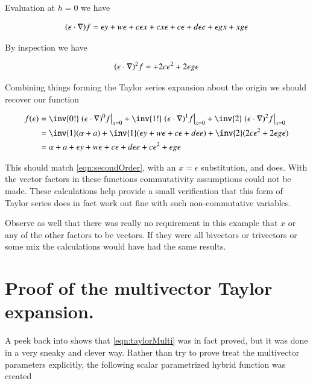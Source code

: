 \documentclass{article}
\begin{document}
Evaluation at $h=0$ we have

\begin{align*}
(\epsilon \cdot \nabla) f
&=
\epsilon y 
+ w \epsilon
+ c \epsilon x 
+ c x \epsilon
+ c \epsilon 
+ d \epsilon e 
+ \epsilon g x 
+ x g \epsilon \\
\end{align*}

By inspection we have

\begin{align*}
(\epsilon \cdot \nabla)^2 f
&=
+ 2 c \epsilon^2
+ 2 \epsilon g \epsilon \\
\end{align*}

Combining things forming the Taylor series expansion about the origin we should recover our function

\begin{align*}
f(\epsilon) 
&= \inv{0!} \left. (\epsilon \cdot \grad)^0 f \right\vert_{x=0} 
+ \inv{1!} \left. (\epsilon \cdot \grad)^1 f \right\vert_{x=0} 
+ \inv{2} \left. (\epsilon \cdot \grad)^2 f \right\vert_{x=0} \\
&= \inv{1} (\alpha + a) + \inv{1} (\epsilon y + w \epsilon + c \epsilon + d \epsilon e ) + \inv{2}(2 c \epsilon^2 + 2 \epsilon g \epsilon ) \\
&= \alpha + a + \epsilon y + w \epsilon + c \epsilon + d \epsilon e + c \epsilon^2 + \epsilon g \epsilon \\
\end{align*}

This should match \ref{eqn:secondOrder}, with an $x = \epsilon$ substitution, and does.  With the vector factors in these functions commutativity 
assumptions could not be made.  These calculations 
help provide a small verification that this form
of Taylor series does in fact work out fine with such non-commutative variables.

Observe as well that there was really no requirement in this example that $x$ or any of the other factors to be vectors.  If they were all bivectors or trivectors or some mix the calculations would have had the same results.

\section{ Proof of the multivector Taylor expansion. }

A peek back into \cite{hestenes1999nfc} shows that 
\ref{eqn:taylorMulti} was in fact proved, but it was done in a very
sneaky and clever way.  Rather than try to prove treat the multivector
parameters explicitly, the following scalar parametrized hybrid function
was created
\end{document}
